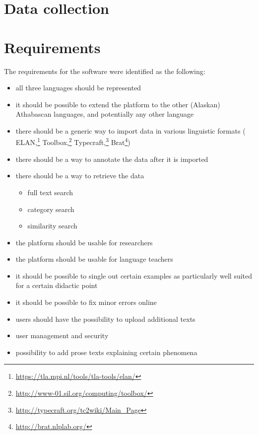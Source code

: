 \documentclass[10pt, a4paper]{article}
\begin{document}
\section{Data collection}



\section{Requirements} 
The requirements for the software were identified as the following: 
\begin{itemize}
 \item all three languages should be represented 
 \item it should be possible to extend the platform to the other (Alaskan) Athabascan languages, and potentially any other language 
 \item there should be a generic way to import data in various linguistic formats 
 (%
ELAN,\footnote{\url{https://tla.mpi.nl/tools/tla-tools/elan/}} 
Toolbox,\footnote{\url{http://www-01.sil.org/computing/toolbox/}}
Typecraft,\footnote{\url{http://typecraft.org/tc2wiki/Main_Page}} 
Brat\footnote{\url{http://brat.nlplab.org/}})
 \item there should be a way to annotate the data after it is imported
 \item there should be a way to retrieve the data 
 \begin{itemize}
  \item full text search 
  \item category search 
  \item similarity search 
 \end{itemize}
 \item the platform should be usable for researchers 
 \item the platform should be usable for language teachers 
 \item it should be possible to single out certain examples as particularly well suited for a certain didactic point
 \item it should be possible to fix minor errors online 
 \item users should have the possibility to upload additional texts
 \item user management and security
 \item possibility to add prose texts explaining certain phenomena
\end{itemize}
\end{document}
